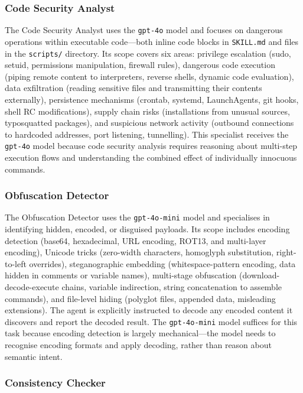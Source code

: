 \subsubsection{Code Security Analyst}

The Code Security Analyst uses the \texttt{gpt-4o} model and focuses on dangerous operations within executable code---both inline code blocks in \texttt{SKILL.md} and files in the \texttt{scripts/} directory. Its scope covers six areas: privilege escalation (sudo, setuid, permissions manipulation, firewall rules), dangerous code execution (piping remote content to interpreters, reverse shells, dynamic code evaluation), data exfiltration (reading sensitive files and transmitting their contents externally), persistence mechanisms (crontab, systemd, LaunchAgents, git hooks, shell RC modifications), supply chain risks (installations from unusual sources, typosquatted packages), and suspicious network activity (outbound connections to hardcoded addresses, port listening, tunnelling). This specialist receives the \texttt{gpt-4o} model because code security analysis requires reasoning about multi-step execution flows and understanding the combined effect of individually innocuous commands.

\subsubsection{Obfuscation Detector}

The Obfuscation Detector uses the \texttt{gpt-4o-mini} model and specialises in identifying hidden, encoded, or disguised payloads. Its scope includes encoding detection (base64, hexadecimal, URL encoding, ROT13, and multi-layer encoding), Unicode tricks (zero-width characters, homoglyph substitution, right-to-left overrides), steganographic embedding (whitespace-pattern encoding, data hidden in comments or variable names), multi-stage obfuscation (download-decode-execute chains, variable indirection, string concatenation to assemble commands), and file-level hiding (polyglot files, appended data, misleading extensions). The agent is explicitly instructed to decode any encoded content it discovers and report the decoded result. The \texttt{gpt-4o-mini} model suffices for this task because encoding detection is largely mechanical---the model needs to recognise encoding formats and apply decoding, rather than reason about semantic intent.

\subsubsection{Consistency Checker}

